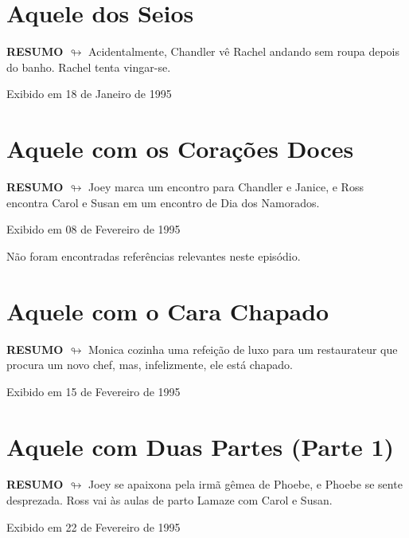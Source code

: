 \chapter{Aquele dos Seios}

\textbf{RESUMO $\looparrowright$} Acidentalmente, Chandler vê Rachel andando sem roupa depois do banho. Rachel tenta vingar-se.

\begin{flushright}
\textcolor{gray600}{Exibido em 18 de Janeiro de 1995}
\end{flushright}


\chapter{Aquele com os Corações Doces}

\textbf{RESUMO $\looparrowright$} Joey marca um encontro para Chandler e Janice, e Ross encontra Carol e Susan em um encontro de Dia dos Namorados.

\begin{flushright}
\textcolor{gray600}{Exibido em 08 de Fevereiro de 1995}
\end{flushright}
Não foram encontradas referências relevantes neste episódio.

\chapter{Aquele com o Cara Chapado}

\textbf{RESUMO $\looparrowright$} Monica cozinha uma refeição de luxo para um restaurateur que procura um novo chef, mas, infelizmente, ele está chapado.

\begin{flushright}
\textcolor{gray600}{Exibido em 15 de Fevereiro de 1995}
\end{flushright}


\chapter{Aquele com Duas Partes (Parte 1)}

\textbf{RESUMO $\looparrowright$} Joey se apaixona pela irmã gêmea de Phoebe, e Phoebe se sente desprezada. Ross vai às aulas de parto Lamaze com Carol e Susan.

\begin{flushright}
\textcolor{gray600}{Exibido em 22 de Fevereiro de 1995}
\end{flushright}


